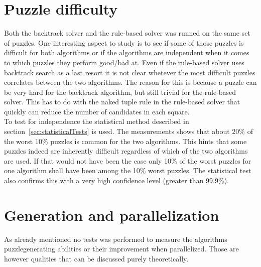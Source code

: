 \documentclass[a4paper,11pt]{kth-mag}
\begin{document}
\FloatBarrier
\section{Puzzle difficulty}
\label{sec:difficultyAnalysis}
Both the backtrack solver and the rule-based solver was runned on the same set of puzzles. One interesting aspect to study is to see if some of those puzzles is difficult for both algorithms or if the algorithms are independent when it comes to which puzzles they perform good/bad at.
Even if the rule-based solver uses backtrack search as a last resort it is not clear whetever the most difficult puzzles correlates between the two algorithms.
The reason for this is because a puzzle can be very hard for the backtrack algorithm, but still trivial for the rule-based solver. 
This has to do with the naked tuple rule in the rule-based solver that quickly can reduce the number of candidates in each square.
\\
To test for independence the statistical method described in section~\ref{sec:statisticalTests} is used.
The measurements shows that about 20\% of the worst 10\% puzzles is common for the two algorithms. 
This hints that some puzzles indeed are inherently difficult regardless of which of the two algorithms are used.
If that would not have been the case only 10\% of the worst puzzles for one algorithm shall have been among the 10\% worst puzzles.
The statistical test also confirms this with a very high confidence level (greater than 99.9\%).


\section{Generation and parallelization}
\label{sec:generation}
As already mentioned no tests was performed to measure the algorithms puzzlegenerating abilities or their improvement when parallelized.
Those are however qualities that can be discussed purely theoretically.
\end{document}
